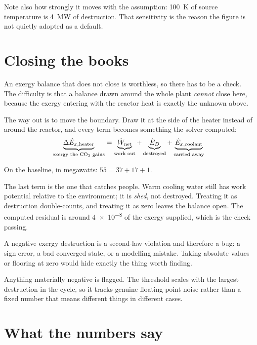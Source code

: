 \documentclass[11pt,a4paper]{report}
\begin{document}
Note also how strongly it moves with the assumption: \SI{100}{\kelvin} of
source temperature is \SI{4}{\mega\watt} of destruction. That sensitivity is
the reason the figure is not quietly adopted as a default.

\section{Closing the books}

An exergy balance that does not close is worthless, so there has to be a
check. The difficulty is that a balance drawn around the whole plant
\emph{cannot} close here, because the exergy entering with the reactor heat
is exactly the unknown above.

The way out is to move the boundary. Draw it at the  side of the
heater instead of around the reactor, and every term becomes something the
solver computed:
\[
  \underbrace{\Delta \dot E_{x,\text{heater}}}_{\text{exergy the \ce{CO2} gains}}
  = \underbrace{\dot W_{\text{net}}}_{\text{work out}}
  + \underbrace{\dot E_{D}}_{\text{destroyed}}
  + \underbrace{\dot E_{x,\text{coolant}}}_{\text{carried away}}
\]

On the baseline, in megawatts: $55 = 37 + 17 + 1$.

The last term is the one that catches people. Warm cooling water still has
work potential relative to the environment; it is \emph{shed}, not
destroyed. Treating it as destruction double-counts, and treating it as zero
leaves the balance open. The computed residual is around
\num{4e-8} of the exergy supplied, which is the check passing.

\begin{caveat}[title={Caveat: negative destruction is never clipped}]
A negative exergy destruction is a second-law violation and therefore a bug:
a sign error, a bad converged state, or a modelling mistake. Taking absolute
values or flooring at zero would hide exactly the thing worth finding.

Anything materially negative is flagged. The threshold scales with the
largest destruction in the cycle, so it tracks genuine floating-point noise
rather than a fixed number that means different things in different cases.
\end{caveat}

\section{What the numbers say}
\label{sec:exresults}
\end{document}
